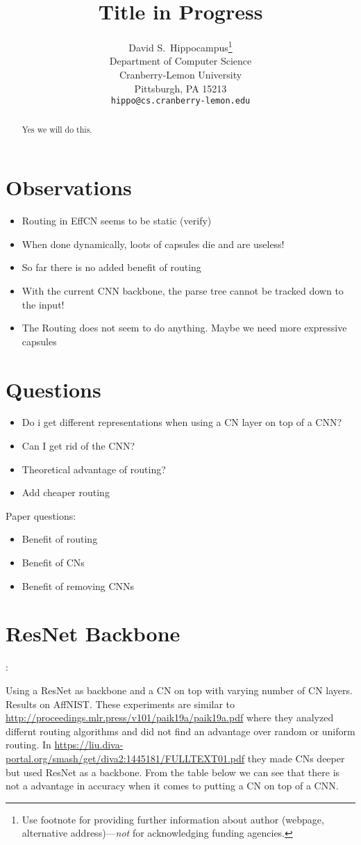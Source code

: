\documentclass{article}
\title{Title in Progress}
\author{%
  David S.~Hippocampus\thanks{Use footnote for providing further information
    about author (webpage, alternative address)---\emph{not} for acknowledging
    funding agencies.} \\
  Department of Computer Science\\
  Cranberry-Lemon University\\
  Pittsburgh, PA 15213 \\
  \texttt{hippo@cs.cranberry-lemon.edu} \\
}
\begin{document}
\maketitle

\begin{abstract}
  Yes we will do this.
\end{abstract}

\section{Observations}
\begin{itemize}
	\item Routing in EffCN seems to be static (verify)
	\item When done dynamically, loots of capsules die and are useless!
	\item So far there is no added benefit of routing
	\item With the current CNN backbone, the parse tree cannot be tracked down to the input!
	\item The Routing does not seem to do anything. Maybe we need more expressive capsules
\end{itemize}

\section{Questions}
\begin{itemize}
	\item Do i get different representations when using a CN layer on top of a CNN?
	\item Can I get rid of the CNN?
	\item Theoretical advantage of routing?
	\item Add cheaper routing
\end{itemize}

Paper questions:
\begin{itemize}
	\item Benefit of routing
	\item Benefit of CNs
	\item Benefit of removing CNNs
\end{itemize}

\section{ResNet Backbone}:

Using a ResNet as backbone and a CN on top with varying number of CN layers. Results on AffNIST. These experiments are similar to \url{http://proceedings.mlr.press/v101/paik19a/paik19a.pdf}  where they analyzed differnt routing algorithms and did not find an advantage over random or uniform routing.
In \url{https://liu.diva-portal.org/smash/get/diva2:1445181/FULLTEXT01.pdf} they made CNs deeper but used ResNet as a backbone. From the table below we can see that there is not a advantage in accuracy when it comes to putting a CN on top of a CNN.
\end{document}
